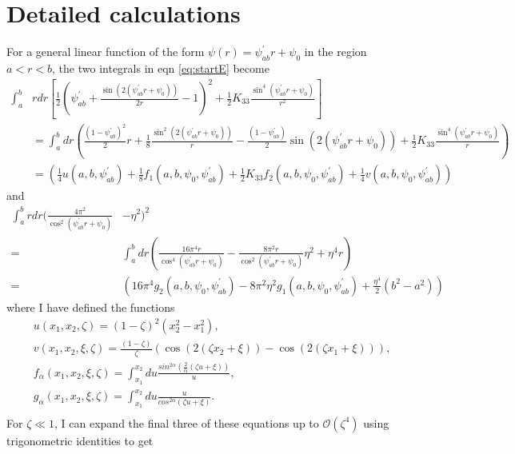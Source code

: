 \documentclass[12pt]{article}
\begin{document}
\section{Detailed calculations}
For a general linear function of the form $\psi(r)=\psi_{ab}^{\prime}r+\psi_0$ in the region $a<r<b$, the two integrals in eqn \ref{eq:startE} become
\begin{align}
\int_{a}^{b}&rdr\left[\frac{1}{2}\left(\psi_{ab}^{\prime}+\frac{\sin(2(\psi_{ab}^{\prime}r+\psi_0))}{2r}-1\right)^2+\frac{1}{2}K_{33}\frac{\sin^4(\psi_{ab}^{\prime}r+\psi_0)}{r^2}\right]\nonumber\\
&=\int_{a}^{b}dr\left(\frac{(1-\psi_{ab}^{\prime})^2}{2}r+\frac{1}{8}\frac{\sin^2(2(\psi_{ab}^{\prime}r+\psi_0))}{r}-\frac{(1-\psi_{ab}^{\prime})}{2}\sin(2(\psi_{ab}^{\prime}r+\psi_0))+\frac{1}{2}K_{33}\frac{\sin^4(\psi_{ab}^{\prime}r+\psi_0)}{r}\right)\nonumber\\
&=\left(\frac{1}{4}u(a,b,\psi_{ab}^{\prime})+\frac{1}{8}f_1(a,b,\psi_0,\psi_{ab}^{\prime})+\frac{1}{2}K_{33}f_2(a,b,\psi_0,\psi_{ab}^{\prime})+\frac{1}{4}v(a,b,\psi_0,\psi_{ab}^{\prime})\right)
\end{align}
and
\begin{align}
\int_{a}^{b}rdr\bigg(\frac{4\pi^2}{\cos^2(\psi_{ab}^{\prime}r+\psi_0)}&-\eta^2\bigg)^2\nonumber\\
=&\int_{a}^{b}dr\left(\frac{16\pi^4r}{\cos^4(\psi_{ab}^{\prime}r+\psi_0)}-\frac{8\pi^2r}{\cos^2(\psi_{ab}^{\prime}r+\psi_0)}\eta^2+\eta^4r\right)\nonumber\\
=&\left(16\pi^4g_2(a,b,\psi_0,\psi_{ab}^{\prime})-8\pi^2\eta^2g_1(a,b,\psi_0,\psi_{ab}^{\prime})+\frac{\eta^4}{2}(b^2-a^2)\right)
\end{align}
where I have defined the functions
\begin{subequations}
\begin{align}
&u(x_1,x_2,\zeta)=(1-\zeta)^2(x_2^2-x_1^2),\label{eq:ufunc}\\
&v(x_1,x_2,\xi,\zeta)=\frac{(1-\zeta)}{\zeta}(\cos(2(\zeta x_2+\xi))-\cos(2(\zeta x_1+\xi))),\label{eq:vfunc}\\
&f_{\alpha}(x_1,x_2,\xi,\zeta)=\int_{x_1}^{x_2}du\frac{sin^{2\alpha}\left(\frac{2}{\alpha}(\zeta u+\xi)\right)}{u},\label{eq:falpha}\\
&g_{\alpha}(x_1,x_2,\xi,\zeta)=\int_{x_1}^{x_2}du\frac{u}{cos^{2\alpha}(\zeta u+\xi)}.\label{eq:galpha}\\
\end{align}
\end{subequations}
For $\zeta\ll1$, I can expand the final three of these equations up to $\mathcal{O}(\zeta^4)$ using trigonometric identities to get
\end{document}
